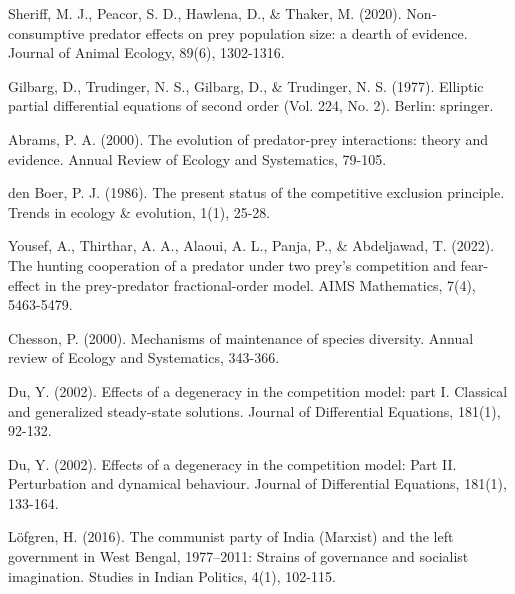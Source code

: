 \documentclass[10pt]{amsart}
\theoremstyle{definition}
\begin{document}
\begin{thebibliography}{}
Sheriff, M. J., Peacor, S. D., Hawlena, D., \& Thaker, M. (2020). Non‐consumptive predator effects on prey population size: a dearth of evidence. Journal of Animal Ecology, 89(6), 1302-1316.

Gilbarg, D., Trudinger, N. S., Gilbarg, D., \& Trudinger, N. S. (1977). Elliptic partial differential equations of second order (Vol. 224, No. 2). Berlin: springer.


	Abrams, P. A. (2000). The evolution of predator-prey interactions: theory and evidence. Annual Review of Ecology and Systematics, 79-105.

den Boer, P. J. (1986). The present status of the competitive exclusion principle. Trends in ecology \& evolution, 1(1), 25-28.

Yousef, A., Thirthar, A. A., Alaoui, A. L., Panja, P., \& Abdeljawad, T. (2022). The hunting cooperation of a predator under two prey's competition and fear-effect in the prey-predator fractional-order model. AIMS Mathematics, 7(4), 5463-5479.

Chesson, P. (2000). Mechanisms of maintenance of species diversity. Annual review of Ecology and Systematics, 343-366.

%
Du, Y. (2002). Effects of a degeneracy in the competition model: part I. Classical and generalized steady-state solutions. Journal of Differential Equations, 181(1), 92-132.

Du, Y. (2002). Effects of a degeneracy in the competition model: Part II. Perturbation and dynamical behaviour. Journal of Differential Equations, 181(1), 133-164.




Löfgren, H. (2016). The communist party of India (Marxist) and the left government in West Bengal, 1977–2011: Strains of governance and socialist imagination. Studies in Indian Politics, 4(1), 102-115.


\end{thebibliography}
\end{document}
